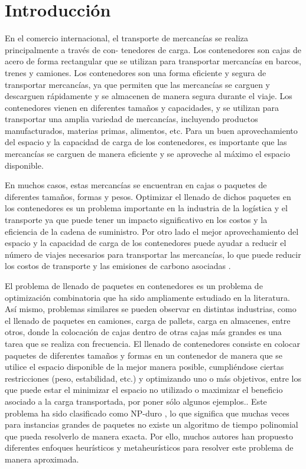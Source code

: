 \section{Introducción} \label{sec: introducción}

En el comercio internacional, el transporte de mercancías se realiza principalmente a través de con- tenedores de carga. Los contenedores son cajas de acero de forma rectangular que se utilizan para transportar mercancías en barcos, trenes y camiones. Los contenedores son una forma eficiente y segura de transportar mercancías, ya que permiten que las mercancías se carguen y descarguen rápidamente y se almacenen de manera segura durante el viaje. Los contenedores vienen en diferentes tamaños y capacidades, y se utilizan para transportar una amplia variedad de mercancías, incluyendo productos manufacturados, materias primas, alimentos, etc. Para un buen aprovechamiento del espacio y la capacidad de carga de los contenedores, es importante que las mercancías se carguen de manera eficiente y se aproveche al máximo el espacio disponible.

En muchos casos, estas mercancías se encuentran en cajas o paquetes de diferentes tamaños, formas y pesos. Optimizar el llenado de dichos paquetes en los contenedores es un problema importante en la industria de la logística y el transporte ya que puede tener un impacto significativo en los costos y la eficiencia de la cadena de suministro. Por otro lado el mejor aprovechamiento del espacio y la capacidad de carga de los contenedores puede ayudar a reducir el número de viajes necesarios para transportar las mercancías, lo que puede reducir los costos de transporte y las emisiones de carbono asociadas \cite{Parreo2008AMA}.

El problema de llenado de paquetes en contenedores es un problema de optimización combinatoria que ha sido ampliamente estudiado en la literatura. Así mismo, problemas similares se pueden observar en distintas industrias, como el llenado de paquetes en camiones, carga de pallets, carga en almacenes, entre otros, donde la colocación de cajas dentro de otras cajas más grandes es una tarea que se realiza con frecuencia. El llenado de contenedores consiste en colocar paquetes de diferentes tamaños y formas en un contenedor de manera que se utilice el espacio disponible de la mejor manera posible, cumpliéndose ciertas restricciones (peso, estabilidad, etc.) y optimizando uno o más objetivos, entre los que puede estar el minimizar el espacio no utilizado o maximizar el beneficio asociado a la carga transportada, por poner sólo algunos ejemplos.. Este problema ha sido clasificado como NP-duro \textcite{PISINGER2002382}, lo que significa que muchas veces para instancias grandes de paquetes no existe un algoritmo de tiempo polinomial que pueda resolverlo de manera exacta. Por ello, muchos autores han propuesto diferentes enfoques heurísticos y metaheurísticos para resolver este problema de manera aproximada.

